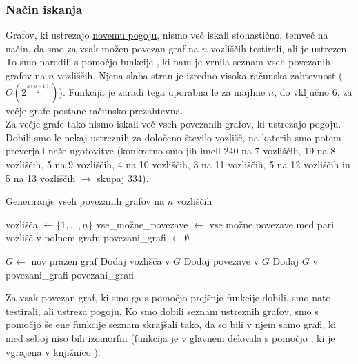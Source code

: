 \documentclass[a4paper,12pt]{article}
\theoremstyle{definition}
\begin{document}
\subsubsection{Način iskanja}
Grafov, ki ustrezajo \hyperref[nov_pogoj]{novemu pogoju}, nismo več iskali stohastično, temveč na način, da smo za vsak možen povezan graf na $n$ vozliščih testirali, ali je ustrezen. To smo naredili s pomočjo funkcije , ki nam je vrnila seznam vseh povezanih grafov na $n$ vozliščih. Njena slaba stran je izredno visoka računska zahtevnost ($O(2^\frac{n(n-1)}{2})$). Funkcija je zaradi tega uporabna le za majhne $n$, do vključno 6, za večje grafe postane računsko prezahtevna. \\
Za večje grafe tako nismo iskali več vseh povezanih grafov, ki ustrezajo pogoju. Dobili smo le nekaj ustreznih za določeno število vozlišč, na katerih smo potem preverjali naše ugotovitve (konkretno smo jih imeli 240 na 7 vozliščih, 19 na 8 vozliščih, 5 na 9 vozliščih, 4 na 10 vozliščih, 3 na 11 vozliščih, 5 na 12 vozliščih in 5 na 13 vozliščih $\rightarrow$ skupaj 334). \label{ne_vsi_povezani}
\begin{algorithm}[H]
\caption{Generiranje vseh povezanih grafov na $n$ vozliščih}
\begin{algorithmic}[1]
    \State vozlišča $\gets \{1, \dots, n\}$
    \State vse\_možne\_povezave $\gets$ vse možne povezave med pari vozlišč v polnem grafu
    \State povezani\_grafi $\gets \emptyset$
    
     
            \State $G \gets$ nov prazen graf
            \State Dodaj vozlišča v $G$ 
            \State Dodaj povezave v $G$
                \State Dodaj $G$ v povezani\_grafi
            \EndIf
        \EndFor
    \EndFor
    \State \Return povezani\_grafi
\EndFunction
\end{algorithmic}
\end{algorithm}

\noindent Za vsak povezan graf, ki smo ga s pomočjo prejšnje funkcije dobili, smo nato testirali, ali ustreza \hyperref[nov_pogoj]{pogoju}. Ko smo dobili seznam ustreznih grafov, smo s pomočjo še ene funkcije  seznam skrajšali tako, da so bili v njem samo grafi, ki med seboj niso bili izomorfni (funkcija je v glavnem delovala s pomočjo , ki je vgrajena v knjižnico ).
\end{document}
